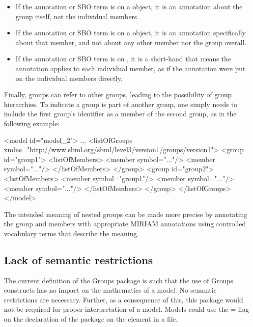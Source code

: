 \begin{itemize}

\item If the annotation or SBO term is on a \Group object, it is an annotation about the group itself, not the individual members.

\item If the annotation or SBO term is on a \Member object, it is an annotation specifically about that member, and not about any other member nor the group overall.

\item If the annotation or SBO term is on \ListOfMembers, it is a short-hand that means the annotation applies to each individual member, as if the annotation were put on the individual members directly.

\end{itemize}

Finally, groups can refer to other groups, leading to the possibility of group hierarchies. To indicate a group is part of another group, one simply needs to include the first group's identifier as a member of the second group, as in the following example:

\clearpage

\begin{example}
<model id="model_2"> 
  ... 
  <listOfGroups xmlns="http://www.sbml.org/sbml/level3/version1/groups/version1"> 
    <group id="group1"> 
      <listOfMembers> 
        <member symbol="..."/> 
        <member symbol="..."/> 
      </listOfMembers> 
    </group> 
    <group id="group2"> 
      <listOfMembers> 
        <member symbol="group1"/> 
        <member symbol="..."/> 
        <member symbol="..."/> 
      </listOfMembers> 
    </group> 
  </listOfGroups> 
</model> 
\end{example}

The intended meaning of nested groups can be made more precise by annotating the group and members with appropriate MIRIAM annotations using controlled vocabulary terms that describe the meaning.


\subsection{Lack of semantic restrictions}
\label{semantic-restrictions}

The current definition of the Groups package is such that the use of Groups constructs has no impact on the mathematics of a model.  No semantic restrictions are necessary. Further, as a consequence of this, this package would not be required for proper interpretation of a model. Models could use the = flag on the declaration of the package on the  element in a file.

